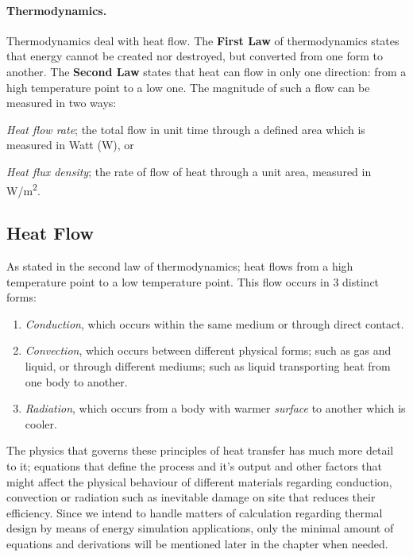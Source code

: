 \paragraph{Thermodynamics.}Thermodynamics deal with heat flow. The \textbf{First Law} of
thermodynamics states that energy cannot be created nor destroyed, but converted from one form to
another. The \textbf{Second Law} states that heat can flow in only one direction: from a high
temperature point to a low one. The magnitude of such a flow can be measured in two ways:
\begin{inparaenum}
  \item \emph{Heat flow rate}; the total flow in unit time through a defined area which is
  measured in Watt (W), or
  \item \emph{Heat flux density}; the rate of flow of heat through a unit area, measured in
  W/m\textsuperscript{2}.
\end{inparaenum}

\subsection{Heat Flow}
As stated in the second law of thermodynamics; heat flows from a high temperature point to a low
temperature point. This flow occurs in 3 distinct forms:
\begin{enumerate}\label{HeatExchange}
  \item \emph{Conduction}, which occurs within the same medium or through direct contact.
  \item \emph{Convection}, which occurs between different physical forms; such as gas and liquid, or
  through different mediums; such as liquid transporting heat from one body to another.
  \item \emph{Radiation}, which occurs from a body with warmer \emph{surface} to another which is
  cooler.
 
\end{enumerate}

The physics that governs these principles of heat transfer has much more detail to it; equations
that define the process and it's output and other factors that might affect the physical behaviour
of different materials regarding conduction, convection or radiation such as inevitable damage on
site that reduces their efficiency. Since we intend to handle matters of calculation regarding
thermal design by means of energy simulation applications, only the minimal amount of equations and
derivations will be mentioned later in the chapter when needed.

